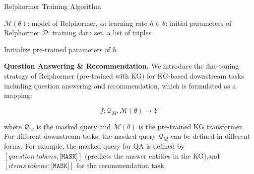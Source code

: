 \documentclass[sigconf]{acmart}
\begin{document}
\begin{algorithm}[t]
  \caption{{Relphormer Training Algorithm}}
  \label{alg1} 


      \SetAlgoLined

      {  
          $\mathcal{M}(\theta)$: model of Relphormer, $\alpha$: learning rate \;
          $h \in \theta$: initial parameters of Relphormer \;
$\mathcal{D}$: training data set, a list of triples\;
      }

      \BlankLine      
        { 
              Initialize pre-trained parameters of $h$\;    
        }


  
\end{algorithm} 
\textbf{Question Answering \& Recommendation.}
We introduce the fine-tuning strategy of Relphormer (pre-trained with KG) for KG-based downstream tasks including question answering and recommendation, which is formulated as a mapping:

\begin{equation}
    f:\mathcal{Q}_M, \mathcal{M}(\theta) \to Y
\end{equation}

where $\mathcal{Q}_M$ is the masked query and $\mathcal{M}(\theta)$ is the pre-trained KG transformer.
For different downstream tasks, the masked query $\mathcal{Q}_M$ can be defined in different forms.
For example, the masked query for QA is defined by $[question~tokens; \texttt{[MASK]}]$ (predicts the answer entities in the KG),and  $[items~tokens; \texttt{[MASK]}]$ for the recommendation task.
\end{document}
